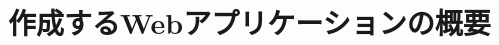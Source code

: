 \documentclass[main]{subfiles}
\begin{document}
\chapter{作成するWebアプリケーションの概要}
\label{cha:application_overview}
\end{document}
